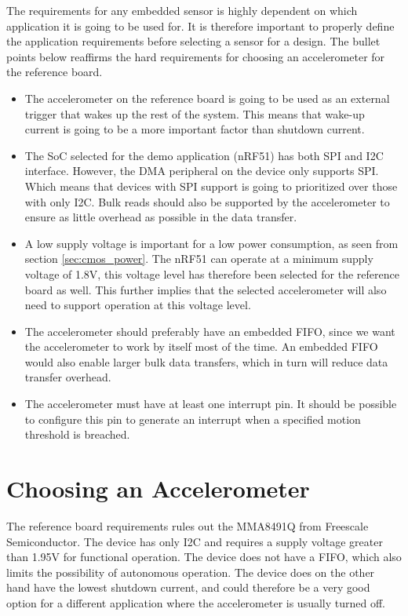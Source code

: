 The requirements for any embedded sensor is highly dependent on which application it is going to be used for. It is therefore important to properly define the application requirements before selecting a sensor for a design. The bullet points below reaffirms the hard requirements for choosing an accelerometer for the reference board. 

\begin{itemize}
\item The accelerometer on the reference board is going to be used as an external trigger that wakes up the rest of the system. This means that wake-up current is going to be a more important factor than shutdown current.
\item The SoC selected for the demo application (nRF51) has both SPI and I2C interface. However, the DMA peripheral on the device only supports SPI. Which means that devices with SPI support is going to prioritized over those with only I2C. Bulk reads should also be supported by the accelerometer to ensure as little overhead as possible in the data transfer. 
\item A low supply voltage is important for a low power consumption, as seen from section \ref{sec:cmos_power}. The nRF51 can operate at a minimum supply voltage of 1.8V, this voltage level has therefore been selected for the reference board as well. This further implies that the selected accelerometer will also need to support operation at this voltage level.
\item The accelerometer should preferably have an embedded FIFO, since we want the accelerometer to work by itself most of the time. An embedded FIFO would also enable larger bulk data transfers, which in turn will reduce data transfer overhead.
\item The accelerometer must have at least one interrupt pin. It should be possible to configure this pin to generate an interrupt when a specified motion threshold is breached.
\end{itemize}

\section{Choosing an Accelerometer}

The reference board requirements rules out the MMA8491Q from Freescale Semiconductor. The device has only I2C and requires a supply voltage greater than 1.95V for functional operation. The device does not have a FIFO, which also limits the possibility of autonomous operation. The device does on the other hand have the lowest shutdown current, and could therefore be a very good option for a different application where the accelerometer is usually turned off. 

